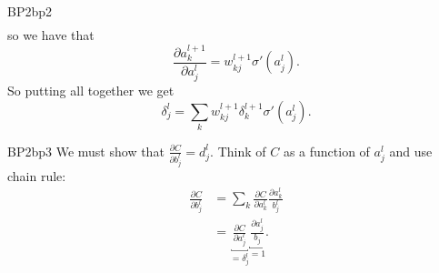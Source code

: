 \documentclass[a4paper,9pt]{extarticle}
\begin{document}
\begin{multicols*}{2}
\begin{myproof}{\color{Turquoise4!80!black}BP2}{bp2}
\begin{align*}
			\end{align*}
			so we have that
			\begin{equation*}
				\frac{\partial a^{l+1}_{k}}{\partial a_{j}^{l}}=w_{kj}^{l+1}\sigma'(a^{l}_{j}).
			\end{equation*}
			So putting all together we get
			\begin{equation*}
				\delta_{j}^{l}=\sum_{k}w_{kj}^{l+1}\delta_{k}^{l+1}\sigma'(a^{l}_{j}).
			\end{equation*}
		\end{myproof}
		\begin{myproof}{\color{Turquoise4!80!black}BP2}{bp3}
			We must show that $\frac{\partial C}{\partial b^{l}_{j}}=d^{l}_{j}$. Think of $C$ as a function of $a^{l}_{j}$ and use chain rule:
			\begin{align*}
				\frac{\partial C}{\partial b_{j}^{l}}&=\sum_{k}\frac{\partial C}{\partial a^{l}_{k}}\frac{\partial a^{l}_{k}}{b_{j}^{l}}\\
				&=\underbracket{\frac{\partial C}{\partial a_{j}^{l}}}_{=\delta_{j}^{l}}\underbracket{\frac{\partial a_{j}^{l}}{b_{j}}}_{=1}.
			\end{align*}
		\end{myproof}
	\end{multicols*}
\end{document}
